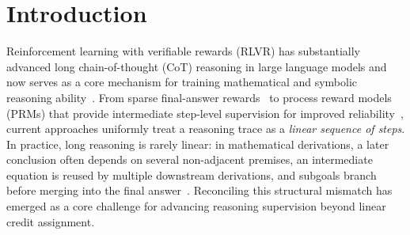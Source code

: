 \section{Introduction}
\label{sec:introduction}

Reinforcement learning with verifiable rewards (RLVR) has substantially advanced long chain-of-thought (CoT) reasoning in large language models and now serves as a core mechanism for training mathematical and symbolic reasoning ability~\citep{wei2022chain,kojima2022large,deepseekr1,yeo2025demystify,shao2024deepseekmath,ke2026com}. From sparse final-answer rewards~\citep{cobbe2021gsm8k,deepseekr1} to process reward models (PRMs) that provide intermediate step-level supervision for improved reliability~\citep{lightman2023lets,wang2024math,uesato2022solving}, current approaches uniformly treat a reasoning trace as a \emph{linear sequence of steps}. In practice, long reasoning is rarely linear: in mathematical derivations, a later conclusion often depends on several non-adjacent premises, an intermediate equation is reused by multiple downstream derivations, and subgoals branch before merging into the final answer~\citep{besta2024graph}. Reconciling this structural mismatch has emerged as a core challenge for advancing reasoning supervision beyond linear credit assignment.

